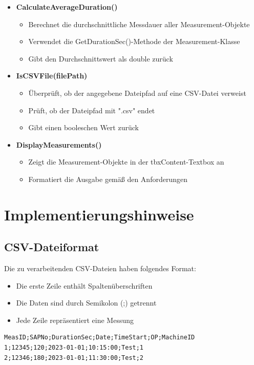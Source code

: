 \documentclass[a4paper,11pt]{article}
\begin{document}
\begin{itemize}
    \item \textbf{CalculateAverageDuration()}
    \begin{itemize}
        \item Berechnet die durchschnittliche Messdauer aller Measurement-Objekte
        \item Verwendet die GetDurationSec()-Methode der Measurement-Klasse
        \item Gibt den Durchschnittswert als double zurück
    \end{itemize}
    
    \item \textbf{IsCSVFile(filePath)}
    \begin{itemize}
        \item Überprüft, ob der angegebene Dateipfad auf eine CSV-Datei verweist
        \item Prüft, ob der Dateipfad mit ".csv" endet
        \item Gibt einen booleschen Wert zurück
    \end{itemize}
    
    \item \textbf{DisplayMeasurements()}
    \begin{itemize}
        \item Zeigt die Measurement-Objekte in der tbxContent-Textbox an
        \item Formatiert die Ausgabe gemäß den Anforderungen
    \end{itemize}
\end{itemize}


\section{Implementierungshinweise}

\subsection{CSV-Dateiformat}
Die zu verarbeitenden CSV-Dateien haben folgendes Format:
\begin{itemize}
    \item Die erste Zeile enthält Spaltenüberschriften
    \item Die Daten sind durch Semikolon (;) getrennt
    \item Jede Zeile repräsentiert eine Messung
\end{itemize}

\begin{verbatim}
MeasID;SAPNo;DurationSec;Date;TimeStart;OP;MachineID
1;12345;120;2023-01-01;10:15:00;Test;1
2;12346;180;2023-01-01;11:30:00;Test;2
\end{verbatim}
\end{document}
